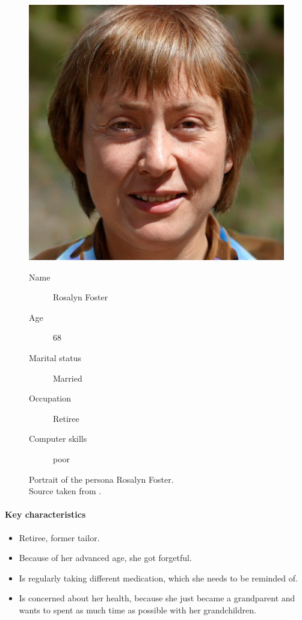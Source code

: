 \documentclass[conference]{IEEEtran}
\begin{document}
\begin{figure}[H]
	\centering
	\begin{minipage}{0.4\linewidth}
		\centerline{\includegraphics[width=\linewidth]{images/persona01.jpg}}
		\caption[Portrait of the persona Rosalyn Foster; Source taken from \cite{personaimg}.]
		{Portrait of the persona Rosalyn Foster.\\ Source taken from \cite{personaimg}.\endtabular}
		\label{fig:persona1}
	\end{minipage}
	\hfill
	\begin{minipage}{0.5\linewidth}
		\vspace{-25pt}
		\begin{description}
			\item[Name] Rosalyn Foster
			\item[Age] 68
			\item[Marital status] Married
			\item[Occupation] Retiree
			\item[Computer skills] poor
		\end{description}
	\end{minipage}
\end{figure}

\paragraph*{Key characteristics}
\begin{itemize}[leftmargin=1.25cm]
	\item Retiree, former tailor.
	\item Because of her advanced age, she got forgetful.
	\item Is regularly taking different medication, which she needs to be reminded of.
	\item Is concerned about her health, because she just became a grandparent and wants to spent as much time as possible with her grandchildren.
\end{itemize}
\end{document}
